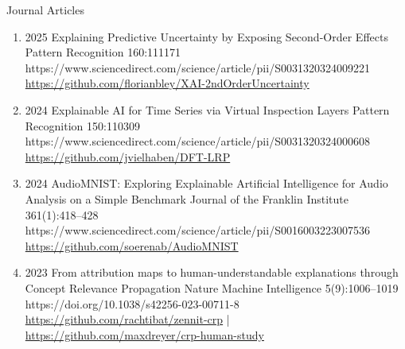 \headedsubsection %
{Journal Articles}{ }
{
\begin{enumerate}

    \item {}
                        {2025}
                        {Explaining Predictive Uncertainty by Exposing Second-Order Effects}
                        {Pattern Recognition}
                        {160:111171}
                        {https://www.sciencedirect.com/science/article/pii/S0031320324009221}
                        {\\ \href{https://github.com/florianbley/XAI-2ndOrderUncertainty}{https://github.com/florianbley/XAI-2ndOrderUncertainty}}

    \item {}
                        {2024}
                        {Explainable AI for Time Series via Virtual Inspection Layers}
                        {Pattern Recognition}
                        {150:110309}
                        {https://www.sciencedirect.com/science/article/pii/S0031320324000608}
                        {\\ \href{https://github.com/jvielhaben/DFT-LRP}{https://github.com/jvielhaben/DFT-LRP}}

    \item {}
                        {2024}
                        {AudioMNIST: Exploring Explainable Artificial Intelligence for Audio Analysis on a Simple Benchmark}
                        {Journal of the Franklin Institute}
                        {361(1):418--428}
                        {https://www.sciencedirect.com/science/article/pii/S0016003223007536}
                        {\\\href{https://github.com/soerenab/AudioMNIST}{https://github.com/soerenab/AudioMNIST}}

    \item {}
                        {2023}
                        {From attribution maps to human-understandable explanations through Concept Relevance Propagation}
                        {Nature Machine Intelligence}
                        {5(9):1006--1019}
                        {https://doi.org/10.1038/s42256-023-00711-8}
                        {   \\
                            \href{https://github.com/rachtibat/zennit-crp}{https://github.com/rachtibat/zennit-crp} |
                            \href{https://github.com/maxdreyer/crp-human-study}{https://github.com/maxdreyer/crp-human-study}
                        }


\end{enumerate}}
